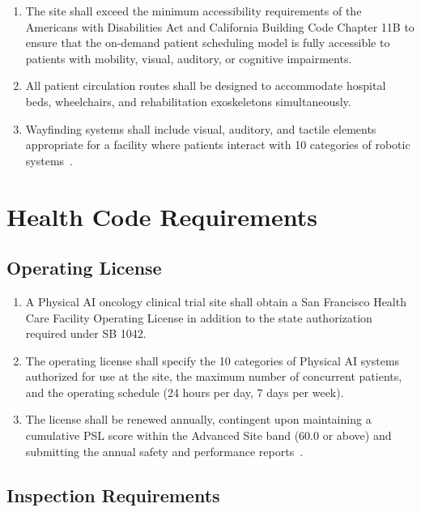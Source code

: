 \begin{enumerate}[label=(\alph*)]
\item The site shall exceed the minimum accessibility requirements of the
  Americans with Disabilities Act and California Building Code Chapter 11B
  to ensure that the on-demand patient scheduling model is fully accessible
  to patients with mobility, visual, auditory, or cognitive impairments.

\item All patient circulation routes shall be designed to accommodate hospital
  beds, wheelchairs, and rehabilitation exoskeletons simultaneously.

\item Wayfinding systems shall include visual, auditory, and tactile elements
  appropriate for a facility where patients interact with 10 categories of
  robotic systems~\cite{patientinstructions2026}.
\end{enumerate}

\section{Health Code Requirements}

\subsection{Operating License}

\begin{enumerate}[label=(\alph*)]
\item A Physical AI oncology clinical trial site shall obtain a San Francisco
  Health Care Facility Operating License in addition to the state authorization
  required under SB 1042.

\item The operating license shall specify the 10 categories of Physical AI
  systems authorized for use at the site, the maximum number of concurrent
  patients, and the operating schedule (24 hours per day, 7 days per week).

\item The license shall be renewed annually, contingent upon maintaining a
  cumulative PSL score within the Advanced Site band (60.0 or above) and
  submitting the annual safety and performance
  reports~\cite{pslframework2026}.
\end{enumerate}

\subsection{Inspection Requirements}

